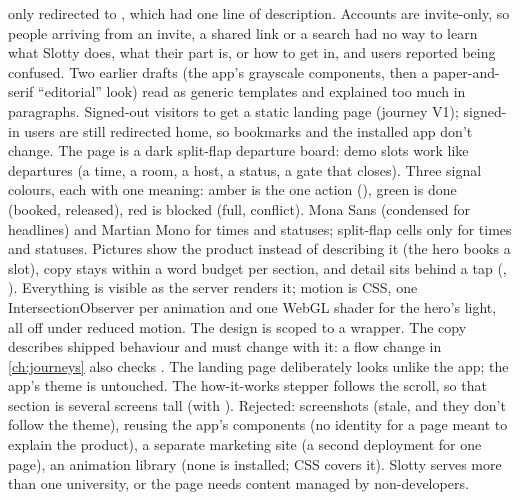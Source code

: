   {\route{/} only redirected to , which had one line of description. Accounts are
   invite-only, so people arriving from an invite, a shared link or a search had no way to learn
   what Slotty does, what their part is, or how to get in, and users reported being confused. Two
   earlier drafts (the app's grayscale components, then a paper-and-serif ``editorial'' look) read
   as generic templates and explained too much in paragraphs.}
  {Signed-out visitors to \route{/} get a static landing page (journey V1); signed-in users are
   still redirected home, so bookmarks and the installed app don't change. The page is a dark
   split-flap departure board: demo slots work like departures (a time, a room, a host, a status,
   a gate that closes). Three signal colours, each with one meaning: amber is the one action
   (), green is done (booked, released), red is blocked (full, conflict). Mona Sans
   (condensed for headlines) and Martian Mono for times and statuses; split-flap cells only for
   times and statuses. Pictures show the product instead of describing it (the hero books a slot),
   copy stays within a word budget per section, and detail sits behind a tap (,
   ). Everything is visible as the server renders it; motion is CSS, one
   IntersectionObserver per animation and one WebGL shader for the hero's light, all off under
   reduced motion. The design is scoped to a  wrapper.}
  {The copy describes shipped behaviour and must change with it: a flow change in
   \cref{ch:journeys} also checks . The landing page deliberately
   looks unlike the app; the app's theme is untouched. The how-it-works stepper follows the scroll,
   so that section is several screens tall (with ). Rejected: screenshots (stale, and they
   don't follow the theme), reusing the app's components (no identity for a page meant to explain
   the product), a separate marketing site (a second deployment for one page), an animation
   library (none is installed; CSS covers it).}
  {Slotty serves more than one university, or the page needs content managed by non-developers.}

